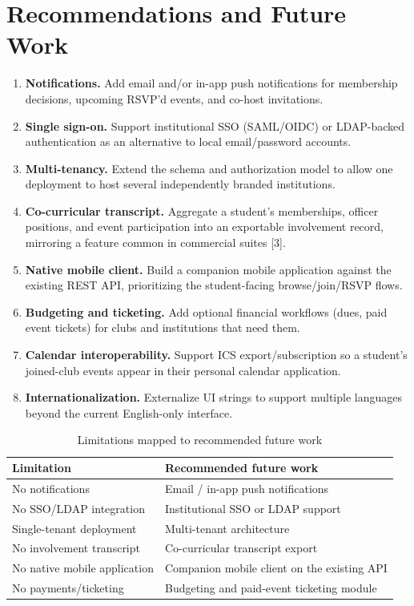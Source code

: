 \documentclass[12pt,oneside]{book}
\begin{document}
\section{Recommendations and Future Work}

\begin{enumerate}
\item \textbf{Notifications.} Add email and/or in-app push notifications for membership decisions, upcoming RSVP'd events, and co-host invitations.
\item \textbf{Single sign-on.} Support institutional SSO (SAML/OIDC) or LDAP-backed authentication as an alternative to local email/password accounts.
\item \textbf{Multi-tenancy.} Extend the schema and authorization model to allow one deployment to host several independently branded institutions.
\item \textbf{Co-curricular transcript.} Aggregate a student's memberships, officer positions, and event participation into an exportable involvement record, mirroring a feature common in commercial suites [3].
\item \textbf{Native mobile client.} Build a companion mobile application against the existing REST API, prioritizing the student-facing browse/join/RSVP flows.
\item \textbf{Budgeting and ticketing.} Add optional financial workflows (dues, paid event tickets) for clubs and institutions that need them.
\item \textbf{Calendar interoperability.} Support ICS export/subscription so a student's joined-club events appear in their personal calendar application.
\item \textbf{Internationalization.} Externalize UI strings to support multiple languages beyond the current English-only interface.
\end{enumerate}

\begin{table}[H]
\caption{Limitations mapped to recommended future work}
\label{tab:7.1}
\centering
\small
\begin{tabularx}{\textwidth}{@{}p{6.2cm}X@{}}
\toprule
Limitation & Recommended future work \\
\midrule
No notifications & Email / in-app push notifications \\
No SSO/LDAP integration & Institutional SSO or LDAP support \\
Single-tenant deployment & Multi-tenant architecture \\
No involvement transcript & Co-curricular transcript export \\
No native mobile application & Companion mobile client on the existing API \\
No payments/ticketing & Budgeting and paid-event ticketing module \\
\bottomrule
\end{tabularx}
\end{table}
\end{document}
